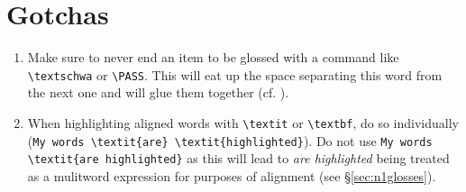 \documentclass[output=paper]{langscibook}
\newcommand{\cmd}[1]{\texttt{\textbackslash#1}}
\begin{document}

\section{Gotchas}
\begin{enumerate}
\item Make sure to never end an item to be glossed with a command like \cmd{textschwa} or \cmd{PASS}. This will eat up the space separating this word from the next one and will glue them together (cf. ). 
\item When highlighting aligned words with \cmd{textit} or \cmd{textbf}, do so individually (\verb+My words \textit{are} \textit{highlighted}+). Do not use \verb+My words+ \verb+\textit{are highlighted}+ as this will lead to \textit{are highlighted} being treated as a mulitword expression for purposes of alignment (see §\ref{sec:n1glosses}).
\end{enumerate}
 
\end{document}
